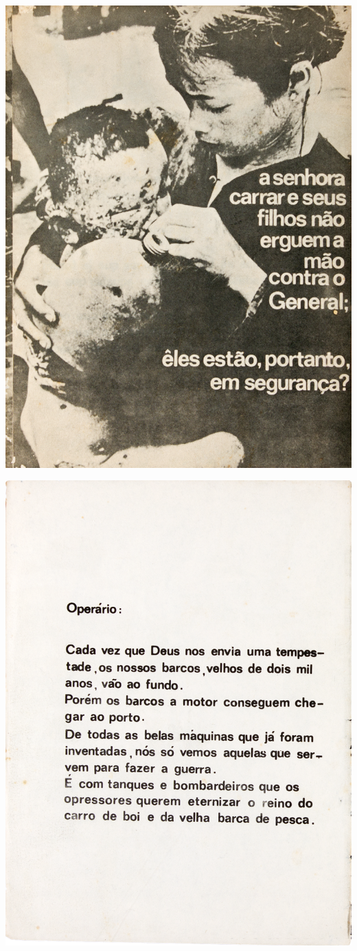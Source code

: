 \includegraphics[width=\columnwidth]{./media/IMAGEM10.png}

\includegraphics[width=\columnwidth]{./media/IMAGEM11.png}

